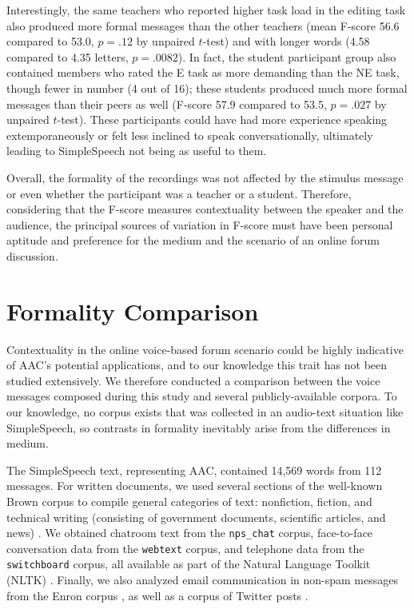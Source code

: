 Interestingly, the same teachers who reported higher task load in the editing task also produced more formal messages than the other teachers (mean F-score 56.6 compared to 53.0, $p=.12$ by unpaired $t$-test) and with longer words (4.58 compared to 4.35 letters, $p=.0082$).
In fact, the student participant group also contained members who rated the E task as more demanding than the NE task, though fewer in number (4 out of 16); these students produced much more formal messages than their peers as well (F-score 57.9 compared to 53.5, $p=.027$ by unpaired $t$-test). 
These participants could have had more experience speaking extemporaneously or felt less inclined to speak conversationally, ultimately leading to SimpleSpeech not being as useful to them.

Overall, the formality of the recordings was not affected by the stimulus message or even whether the participant was a teacher or a student.
Therefore, considering that the F-score measures contextuality between the speaker and the audience, the principal sources of variation in F-score must have been personal aptitude and preference for the medium and the scenario of an online forum discussion.

\section{Formality Comparison}
Contextuality in the online voice-based forum scenario could be highly indicative of AAC's potential applications, and to our knowledge this trait has not been studied extensively.
We therefore conducted a comparison between the voice messages composed during this study and several publicly-available corpora.
To our knowledge, no corpus exists that was collected in an audio-text situation like SimpleSpeech, so contrasts in formality inevitably arise from the differences in medium. 

The SimpleSpeech text, representing AAC, contained 14,569 words from 112 messages.
For written documents, we used several sections of the well-known Brown corpus to compile general categories of text: nonfiction, fiction, and technical writing (consisting of government documents, scientific articles, and news) \cite{brown}.
We obtained chatroom text from the \texttt{nps\_chat} corpus, face-to-face conversation data from the \texttt{webtext} corpus, and telephone data from the \texttt{switchboard} corpus, all available as part of the Natural Language Toolkit (NLTK) \cite{nltk}.
Finally, we also analyzed email communication in non-spam messages from the Enron corpus \cite{enronsent}, as well as a corpus of Twitter posts \cite{twitter}.

